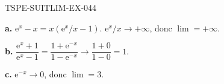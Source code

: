 \begin{corrige}{TSPE-SUITLIM-EX-044}

\textbf{a.} $\mathrm{e}^x - x = x(\mathrm{e}^x/x - 1)$. $\mathrm{e}^x/x \to +\infty$, donc $\boxed{\lim = +\infty}$.

\textbf{b.} $\dfrac{\mathrm{e}^x+1}{\mathrm{e}^x-1} = \dfrac{1+\mathrm{e}^{-x}}{1-\mathrm{e}^{-x}} \to \dfrac{1+0}{1-0} = \boxed{1}$.

\textbf{c.} $\mathrm{e}^{-x} \to 0$, donc $\boxed{\lim = 3}$.

\end{corrige}
